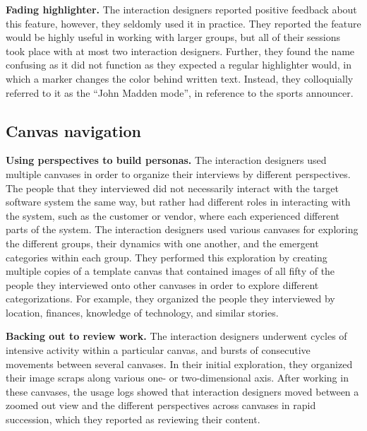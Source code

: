 \textbf{Fading highlighter.} The interaction designers reported positive feedback about this feature, however, they seldomly used it in practice. They reported the feature would be highly useful in working with larger groups, but all of their sessions took place with at most two interaction designers. Further, they found the name confusing as it did not function as they expected a regular highlighter would, in which a marker changes the color behind written text. Instead, they colloquially referred to it as the ``John Madden mode'', in reference to the sports announcer.

\subsection{Canvas navigation}

\textbf{Using perspectives to build personas.} The interaction designers used multiple canvases in order to organize their interviews by different perspectives. The people that they interviewed did not necessarily interact with the target software system the same way, but rather had different roles in interacting with the system, such as the customer or vendor, where each experienced different parts of the system. The interaction designers used various canvases for exploring the different groups, their dynamics with one another, and the emergent categories within each group. They performed this exploration by creating multiple copies of a template canvas that contained images of all fifty of the people they interviewed onto other canvases in order to explore different categorizations. For example, they organized the people they interviewed by location, finances, knowledge of technology, and similar stories. 

\textbf{Backing out to review work.} The interaction designers underwent cycles of intensive activity within a particular canvas, and bursts of consecutive movements between several canvases. In their initial exploration, they organized their image scraps along various one- or two-dimensional axis. After working in these canvases, the usage logs showed that interaction designers moved between a zoomed out view and the different perspectives across canvases in rapid succession, which they reported as reviewing their content.

